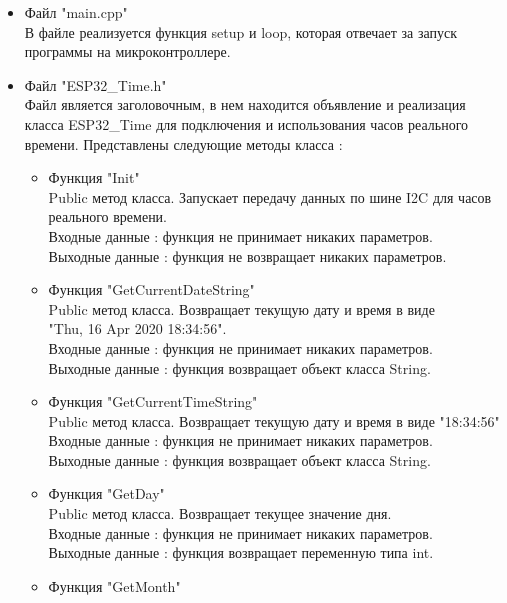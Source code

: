 \documentclass[a4document]{article}
\begin{document}
{\begin{itemize}
    \item Файл "main.cpp" \\
        В файле реализуется функция setup и loop, которая отвечает за запуск программы на микроконтроллере.
    \item Файл "ESP32\_Time.h" \\ 
        Файл является заголовочным, в нем находится объявление и реализация класса ESP32\_Time 
        для подключения и использования часов реального времени.
        Представлены следующие методы класса : 
        \begin{itemize}
            \item Функция "Init" \\ 
                Public метод класса. Запускает передачу данных по шине I2C для часов реального времени. \\
                Входные данные : функция не принимает никаких параметров. \\
                Выходные данные : функция не возвращает никаких параметров.
            \item Функция "GetCurrentDateString" \\ 
                Public метод класса. Возвращает текущую дату и время в виде \\ "Thu, 16 Apr 2020 18:34:56". \\ 
                Входные данные : функция не принимает никаких параметров. \\
                Выходные данные : функция возвращает объект класса String.
            \item Функция "GetCurrentTimeString" \\ 
                Public метод класса. Возвращает текущую дату и время в виде "18:34:56" \\
                Входные данные : функция не принимает никаких параметров. \\
                Выходные данные : функция возвращает объект класса String.
            \item Функция "GetDay" \\
                Public метод класса. Возвращает текущее значение дня.\\
                Входные данные : функция не принимает никаких параметров. \\
                Выходные данные : функция возвращает переменную типа int.
            \item Функция "GetMonth" \\

\end{itemize}
\end{itemize}}
\end{document}
